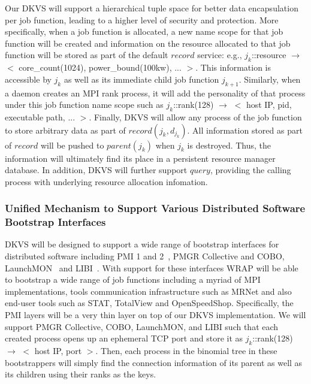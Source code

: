 \documentclass[10pt]{article}
\begin{document}
Our DKVS will support a hierarchical tuple space for better
data encapsulation per job function, leading to a higher level of security and protection. 
More specifically, when a job function is
allocated, a new name scope for that job function will be 
created and information on the resource allocated 
to that job function will be stored as part of the default $record$ service: e.g.,
$j_k$::resource $\rightarrow$ $<$ core\_count(1024), power\_bound(100kw), ... $>$. 
This information is accessible by $j_k$ as well as 
its immediate child job function $j_{k+1}$.
Similarly, when a daemon creates an MPI rank process, it will add the
personality of that process under this job function name scope 
such as $j_k$::rank(128) $\rightarrow$ $<$ host IP, pid, executable path, ... $>$.
Finally, DKVS will allow any process of the job function to store arbitrary data
as part of $record(j_k, d_{j_k})$. All information stored 
as part of $record$ will be pushed to $parent(j_k)$ when $j_k$
is destroyed. Thus, the information will ultimately find its place
in a persistent resource manager database. In addition,  
DKVS will further support $query$, providing the calling process
with underlying resource allocation infomation.

\subsubsection{Unified Mechanism to Support Various Distributed Software Bootstrap Interfaces}
\label{sect:bootstrap}
DKVS will be designed to support a wide range of bootstrap interfaces 
for distributed software including PMI 1 and 2~\cite{PMI2}, PMGR Collective and COBO, 
LaunchMON~\cite{launchmon} and LIBI~\cite{libi}. With support for these interfaces 
WRAP will be able to bootstrap a wide range of job functions including a myriad of 
MPI implementations, tools communication infrastructure such as MRNet 
and also end-user tools such as STAT, TotalView and OpenSpeedShop.
Specifically, the PMI layers will be a very thin layer on top 
of our DKVS implementation. We will support PMGR Collective, 
COBO, LaunchMON, and LIBI such that each created process opens 
up an ephemeral TCP port and store it as $j_k$::rank(128) $\rightarrow$ $<$ host IP, port $>$.
Then, each process in the binomial tree in these bootstrappers
will simply find the connection information of its parent as well as 
its children using their ranks as the keys.
\end{document}
